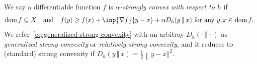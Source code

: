 \documentclass[format=acmsmall,authorversion]{acmart}
\newcommand{\argmin}[1]{\underset{#1}{\operatorname{\mathrm{arg\,max}}}}
\newcommand{\cD}{\mathcal{D}}
\newcommand{\bbR}{\mathbb{R}}
\begin{document}
We say a differentiable function $f$ is \emph{$\alpha$-strongly convex with respect to $h$} if 
\begin{equation}
    \text{dom}\,f \subseteq X \quad\text{and}\quad f(y) \geq f(x) + \inp{\nabla f}{y - x} + \alpha D_h(y\,\Vert\,x) \text{ for any } y, x \in \text{dom}\,f. 
    \label{eq:generalized-strong-convexity}
\end{equation} 
We refer~\cref{eq:generalized-strong-convexity} with an arbitray $D_h(\cdot\,\Vert\,\cdot)$ as \emph{generalized strong convexity} or \emph{relatively strong convexity}, and it reduces to (standard) strong convexity if $D_h(y\,\Vert\,x) = \frac{1}{2} {\left\lVert y - x \right\Vert}^2$. 




\end{document}
